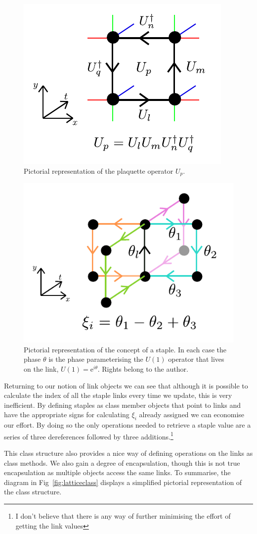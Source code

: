 \documentclass[12pt]{article}
\begin{document}
\begin{figure}
\centering
\hspace*{-1cm}\includegraphics[width=0.5\linewidth]{plaq.pdf}
\caption{\label{fig:plaq} Pictorial representation of the plaquette operator $U_p$.}
\end{figure}

\begin{figure}
\centering
\hspace*{-1cm}\includegraphics[width=0.5\linewidth]{staples.pdf}
\caption{\label{fig:staples} Pictorial representation of the concept of a staple. In each case the phase $\theta$ is the phase parameterising the $U(1)$ operator that lives on the link, $U(1) = \mathrm{e}^{i\theta}$. Rights belong to the author.}
\end{figure}

\par Returning to our notion of link objects we can see that although it is possible to calculate the index of all the staple links every time we update, this is very inefficient. By defining staples as class member objects that point to links and have the appropriate signs for calculating $\xi_i$ already assigned we can economise our effort. By doing so the only operations needed to retrieve a staple value are a series of three dereferences followed by three additions.\footnote{I don't believe that there is any way of further minimising the effort of getting the link values}

\par This class structure also provides a nice way of defining operations on the links as class methods. We also gain a degree of encapsulation, though this is not true encapsulation as multiple objects access the same links. To summarise, the diagram in Fig~\ref{fig:latticeclass} displays a simplified pictorial representation of the class structure.
\end{document}
